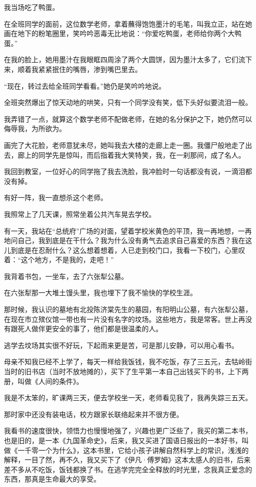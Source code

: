 \par 我当场吃了鸭蛋。
\par 在全班同学的面前，这位数学老师，拿着蘸得饱饱墨汁的毛笔，叫我立正，站在她画在地下的粉笔圈里，笑吟吟恶毒无比地说：“你爱吃鸭蛋，老师给你两个大鸭蛋。”
\par 在我的脸上，她用墨汁在我眼眶四周涂了两个大圆饼，因为墨汁太多了，它们流下来，顺着我紧紧抿住的嘴唇，渗到嘴巴里去。
\par “现在，转过去给全班同学看看。”她仍是笑吟吟地说。
\par 全班突然爆出了惊天动地的哄笑，只有一个同学没有笑，低下头好似要流泪一般。
\par 我弄错了一点，就算这个数学老师不配做老师，在她的名分保护之下，她仍然可以侮辱我，为所欲为。
\par 画完了大花脸，老师意犹未尽，她叫我去大楼的走廊上走一圈。我僵尸般地走了出去，廊上的同学先是惊叫，而后指着我大笑特笑，我，在一刹那间，成了名人。
\par 我回到教室，一位好心的同学拖了我去洗脸，我冲脸时一句话都没有说，一滴泪都没有掉。
\par 有好一阵，我一直想杀这个老师。
\par 我照常上了几天课，照常坐着公共汽车晃去学校。
\par 有一天，我站在“总统府”广场的对面，望着学校米黄色的平顶，我一再地想，一再地问自己，我到底是在干什么？我为什么没有勇气去追求自己喜爱的东西？我在这儿到底是在忍耐什么？这么想着想着，人已走到校门口，我看一下校门，心里叹着：“这个地方，不是我的，走吧！”
\par 我背着书包，一坐车，去了六张犁公墓。
\par 在六张犁那一大堆土馒头里，我也埋下了我不愉快的学校生涯。
\par 那时候，我认识的墓地有北投陈济棠先生的墓园，有阳明山公墓，有六张犁公墓，在现在市立殡仪馆一带也有一片没有名字的坟场。这些地方，我是常客。世上再没有跟死人做伴更安全的事了，他们都是很温柔的人。
\par 逃学去坟场其实很不好玩，下起雨来更是苦，可是那儿安静，可以用心看书。
\par 母亲不知我已经不上学了，每天一样给我饭钱，我不吃饭，存了三五元，去牯岭街当时的旧书店（当时不放地摊的），买下了生平第一本自己出钱买下的书，上下两册，叫做《人间的条件》。
\par 我是不太笨的，旷课两三天，便去学校坐一天，老师看见我了，我再失踪三五天。
\par 那时家中还没有装电话，校方跟家长联络起来并不很方便。
\par 我看书的速度很快，领悟力也慢慢地强了，兴趣也更广泛些了，我买的第二本书，也是旧的，是一本《九国革命史》，后来，我又买进了国语日报出的一本好书，叫做《一千零一个为什么》，这本书里，它给小孩子讲解自然科学上的常识，浅浅的解释，一目了然，再不久，我又买下了《伊凡·傅罗姆》这本太感人的旧书，后来差不多从不吃饭，饭钱都换了书。在逃学完完全全释放的时光里，念我真正爱念的东西，那真是生命最大的享受。

